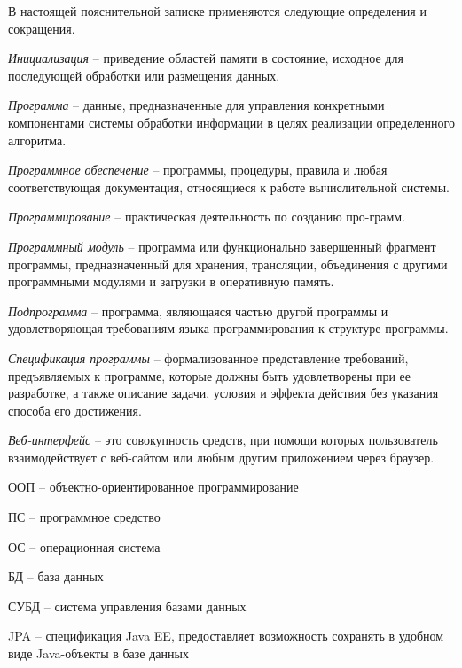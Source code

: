 
В настоящей пояснительной записке применяются следующие определения и сокращения.

\textit{Инициализация} -- приведение областей памяти в состояние, исходное для последующей обработки или размещения данных.

\textit{Программа} -- данные, предназначенные для управления конкретными компонентами системы обработки информации в целях реализации определенного алгоритма.

\textit{Программное обеспечение} -- программы, процедуры, правила и любая соответствующая документация, относящиеся к работе вычислительной системы.

\textit{Программирование} -- практическая деятельность по созданию про-грамм.

\textit{Программный модуль} -- программа или функционально завершенный фрагмент программы, предназначенный для хранения, трансляции, объединения с другими программными модулями и загрузки в оперативную память.

\textit{Подпрограмма} -- программа, являющаяся частью другой программы и удовлетворяющая требованиям языка программирования к структуре программы.

\textit{Спецификация программы} -- формализованное представление требований, предъявляемых к программе, которые должны быть удовлетворены при ее разработке, а также описание задачи, условия и эффекта действия без указания способа его достижения.

\textit{Веб-интерфейс} -- это совокупность средств, при помощи которых пользователь взаимодействует с веб-сайтом или любым другим приложением через браузер.

ООП -- объектно-ориентированное программирование

ПС -- программное средство

ОС -- операционная система

БД -- база данных

СУБД -- система управления базами данных

JPA -- спецификация Java EE, предоставляет возможность сохранять в удобном виде Java-объекты в базе данных
